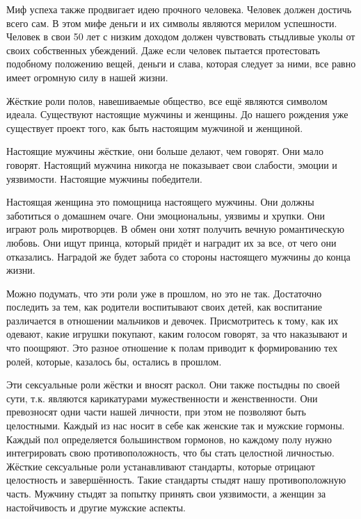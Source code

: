 \documentclass[10pt, fleqn]{article}
\begin{document}
Миф успеха также продвигает идею прочного человека. Человек должен достичь всего сам. В этом мифе деньги и их символы являются мерилом успешности. Человек в свои 50 лет с низким доходом должен чувствовать стыдливые уколы от своих собственных убеждений. Даже если человек пытается протестовать подобному положению вещей, деньги и слава, которая следует за ними, все равно имеет огромную силу в нашей жизни.


Жёсткие роли полов, навешиваемые общество, все ещё являются символом идеала. Существуют настоящие мужчины и женщины. До нашего рождения уже существует проект того, как быть настоящим мужчиной и женщиной.

Настоящие мужчины жёсткие, они больше делают, чем говорят. Они мало говорят. Настоящий мужчина никогда не показывает свои слабости, эмоции и уязвимости. Настоящие мужчины победители.

Настоящая женщина это помощница настоящего мужчины. Они должны заботиться о домашнем очаге. Они эмоциональны, уязвимы и хрупки. Они играют роль миротворцев. В обмен они хотят получить вечную романтическую любовь. Они ищут принца, который придёт и наградит их за все, от чего они отказались. Наградой же будет забота со стороны настоящего мужчины до конца жизни.

Можно подумать, что эти роли уже в прошлом, но это не так. Достаточно последить за тем, как родители воспитывают своих детей, как воспитание различается в отношении мальчиков и девочек. Присмотритесь к тому, как их одевают, какие игрушки покупают, каким голосом говорят, за что наказывают и что поощряют. Это разное отношение к полам приводит к формированию тех ролей, которые, казалось бы, остались в прошлом.

Эти сексуальные роли жёстки и вносят раскол. Они также постыдны по своей сути, т.к. являются карикатурами мужественности и женственности. Они превозносят одни части нашей личности, при этом не позволяют быть целостными. Каждый из нас носит в себе как женские так и мужские гормоны. Каждый пол определяется большинством гормонов, но каждому полу нужно интегрировать свою противоположность, что бы стать целостной личностью. Жёсткие сексуальные роли устанавливают стандарты, которые отрицают целостность и завершённость. Такие стандарты стыдят нашу противоположную часть. Мужчину стыдят за попытку принять свои уязвимости, а женщин за настойчивость и другие мужские аспекты.

\end{document}
